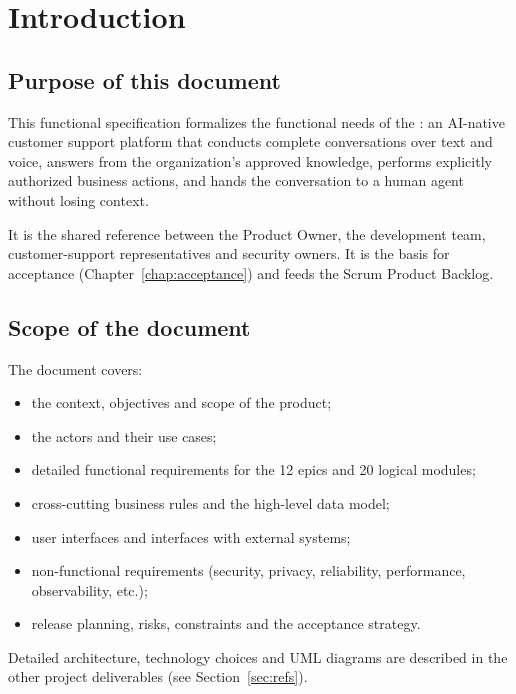 \chapter{Introduction}

\section{Purpose of this document}
This functional specification formalizes the functional needs of the \textbf{\ProjectName}: an AI-native customer support platform that conducts complete conversations over text and voice, answers from the organization's approved knowledge, performs explicitly authorized business actions, and hands the conversation to a human agent without losing context.

It is the shared reference between the Product Owner, the development team, customer-support representatives and security owners. It is the basis for acceptance (Chapter~\ref{chap:acceptance}) and feeds the Scrum Product Backlog.

\section{Scope of the document}
The document covers:
\begin{itemize}
  \item the context, objectives and scope of the product;
  \item the actors and their use cases;
  \item detailed functional requirements for the 12 epics and 20 logical modules;
  \item cross-cutting business rules and the high-level data model;
  \item user interfaces and interfaces with external systems;
  \item non-functional requirements (security, privacy, reliability, performance, observability, etc.);
  \item release planning, risks, constraints and the acceptance strategy.
\end{itemize}
Detailed architecture, technology choices and UML diagrams are described in the other project deliverables (see Section~\ref{sec:refs}).

